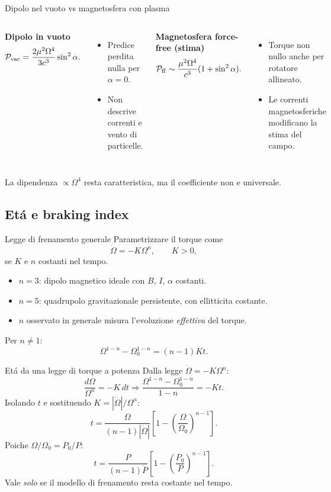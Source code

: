 \begin{frame}[t]{Dipolo nel vuoto vs magnetosfera con plasma}
\small
\begin{columns}[T,onlytextwidth]
\textbf{Dipolo in vuoto}
\[
\mathcal P_{\rm vac}=\frac{2\mu^2\Omega^4}{3c^3}\sin^2\alpha.
\]
\begin{itemize}
\item Predice perdita nulla per $\alpha=0$.
\item Non descrive correnti e vento di particelle.
\end{itemize}
\textbf{Magnetosfera force-free (stima)}
\[
\mathcal P_{\rm ff}\sim\frac{\mu^2\Omega^4}{c^3}(1+\sin^2\alpha).
\]
\begin{itemize}
\item Torque non nullo anche per rotatore allineato.
\item Le correnti magnetosferiche modificano la stima del campo.
\end{itemize}
\end{columns}
\medskip
La dipendenza $\propto\Omega^4$ resta caratteristica, ma il coefficiente non e universale.
\end{frame}

\subsection{Et\'a  e braking index}

\begin{frame}[t]{Legge di frenamento generale}
\small
Parametrizzare il torque come
\[
\dot\Omega=-K\Omega^n,\qquad K>0,
\]
se $K$ e $n$ costanti nel tempo.
\begin{itemize}
\item $n=3$: dipolo magnetico ideale con $B$, $I$, $\alpha$ costanti.
\item $n=5$: quadrupolo gravitazionale persistente, con ellitticita costante.
\item $n$ osservato in generale misura l'evoluzione \emph{effettiva} del torque.
\end{itemize}
Per $n\neq1$:
\[
\Omega^{1-n}-\Omega_0^{1-n}=(n-1)Kt.
\]
\end{frame}

\begin{frame}[t]{Et\'a da una legge di torque a potenza}
\small
Dalla legge $\dot\Omega=-K\Omega^n$:
\[
\frac{d\Omega}{\Omega^n}=-K\,dt
\Rightarrow
\frac{\Omega^{1-n}-\Omega_0^{1-n}}{1-n}=-Kt.
\]
Isolando $t$ e sostituendo $K=|\dot\Omega|/\Omega^n$:
\[
t=\frac{\Omega}{(n-1)|\dot\Omega|}
\left[1-\left(\frac{\Omega}{\Omega_0}\right)^{n-1}\right].
\]
Poiche $\Omega/\Omega_0=P_0/P$:
\[
t=\frac{P}{(n-1)\dot P}
\left[1-\left(\frac{P_0}{P}\right)^{n-1}\right].
\]
Vale \emph{solo} se il modello di frenamento resta costante nel tempo.
\end{frame}

